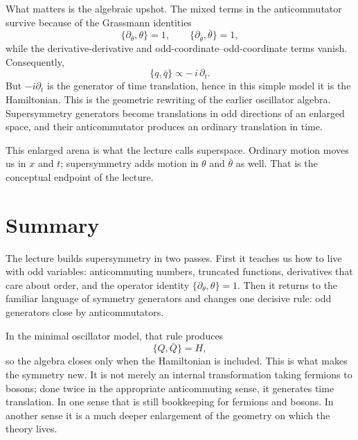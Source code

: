 What matters is the algebraic upshot. The mixed terms in the anticommutator survive because of the Grassmann identities
\begin{equation}
\{\partial_\theta,\theta\}=1,
\qquad
\{\partial_{\bar\theta},\bar\theta\}=1,
\end{equation}
while the derivative-derivative and odd-coordinate--odd-coordinate terms vanish. Consequently,
\begin{equation}
\{q,\bar q\}\propto -\,i\,\partial_t.
\end{equation}
But \(-i\partial_t\) is the generator of time translation, hence in this simple model it is the Hamiltonian. This is the geometric rewriting of the earlier oscillator algebra. Supersymmetry generators become translations in odd directions of an enlarged space, and their anticommutator produces an ordinary translation in time.

This enlarged arena is what the lecture calls superspace. Ordinary motion moves us in \(x\) and \(t\); supersymmetry adds motion in \(\theta\) and \(\bar\theta\) as well. That is the conceptual endpoint of the lecture.

\section{Summary}

The lecture builds supersymmetry in two passes. First it teaches us how to live with odd variables: anticommuting numbers, truncated functions, derivatives that care about order, and the operator identity \(\{\partial_\theta,\theta\}=1\). Then it returns to the familiar language of symmetry generators and changes one decisive rule: odd generators close by anticommutators.

In the minimal oscillator model, that rule produces
\begin{equation}
\{Q,\bar Q\}=H,
\end{equation}
so the algebra closes only when the Hamiltonian is included. This is what makes the symmetry new. It is not merely an internal transformation taking fermions to bosons; done twice in the appropriate anticommuting sense, it generates time translation. In one sense that is still bookkeeping for fermions and bosons. In another sense it is a much deeper enlargement of the geometry on which the theory lives.